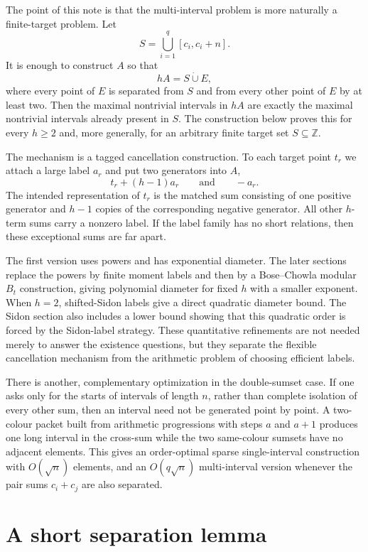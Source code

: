 \documentclass[11pt]{article}
\newcommand{\Z}{\mathbb{Z}}
\begin{document}
The point of this note is that the multi-interval problem is more naturally a
finite-target problem. Let
\[
 S=\bigcup_{i=1}^q[c_i,c_i+n].
\]
It is enough to construct $A$ so that
\[
 hA=S\mathbin{\dot\cup}E,
\]
where every point of $E$ is separated from $S$ and from every other point of
$E$ by at least two. Then the maximal nontrivial intervals in $hA$ are
exactly the maximal nontrivial intervals already present in $S$. The
construction below proves this for every $h\geq 2$ and, more generally, for
an arbitrary finite target set $S\subseteq\Z$.

The mechanism is a tagged cancellation construction. To each target point
$t_r$ we attach a large label $a_r$ and put two generators into $A$,
\[
 t_r+(h-1)a_r
 \qquad\text{and}\qquad
 -a_r.
\]
The intended representation of $t_r$ is the matched sum consisting of one
positive generator and $h-1$ copies of the corresponding negative generator.
All other $h$-term sums carry a nonzero label. If the label family has no
short relations, then these exceptional sums are far apart.

The first version uses powers and has exponential diameter. The later
sections replace the powers by finite moment labels and then by a
Bose--Chowla modular $B_t$ construction, giving polynomial diameter for fixed
$h$ with a smaller exponent. When $h=2$, shifted-Sidon labels give a direct
quadratic diameter bound. The Sidon section also includes a lower bound
showing that this quadratic order is forced by the Sidon-label strategy.
These quantitative refinements are not needed merely to answer the existence
questions, but they separate the flexible cancellation mechanism from the
arithmetic problem of choosing efficient labels.

There is another, complementary optimization in the double-sumset case. If
one asks only for the starts of intervals of length $n$, rather than complete
isolation of every other sum, then an interval need not be generated point by
point. A two-colour packet built from arithmetic progressions with steps $a$
and $a+1$ produces one long interval in the cross-sum while the two same-colour
sumsets have no adjacent elements. This gives an order-optimal sparse
single-interval construction with $O(\sqrt n)$ elements, and an
$O(q\sqrt n)$ multi-interval version whenever the pair sums $c_i+c_j$ are
also separated.

\section{A short separation lemma}
\end{document}
